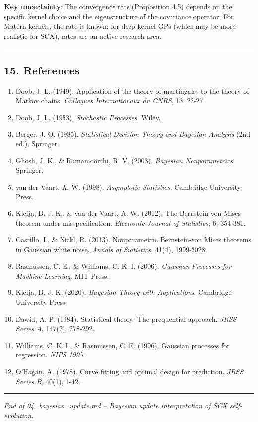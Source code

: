 \documentclass[
  12pt,
]{article}
\providecommand{\tightlist}{%
  \setlength{\itemsep}{0pt}\setlength{\parskip}{0pt}}
\begin{document}
\textbf{Key uncertainty}: The convergence rate (Proposition 4.5) depends
on the specific kernel choice and the eigenstructure of the covariance
operator. For Matérn kernels, the rate is known; for deep kernel GPs
(which may be more realistic for SCX), rates are an active research
area.

\begin{center}\rule{0.5\linewidth}{0.5pt}\end{center}

\subsection{15. References}\label{references}

\begin{enumerate}
\def\labelenumi{\arabic{enumi}.}
\tightlist
\item
  Doob, J. L. (1949). Application of the theory of martingales to the
  theory of Markov chains. \emph{Colloques Internationaux du CNRS}, 13,
  23-27.
\item
  Doob, J. L. (1953). \emph{Stochastic Processes}. Wiley.
\item
  Berger, J. O. (1985). \emph{Statistical Decision Theory and Bayesian
  Analysis} (2nd ed.). Springer.
\item
  Ghosh, J. K., \& Ramamoorthi, R. V. (2003). \emph{Bayesian
  Nonparametrics}. Springer.
\item
  van der Vaart, A. W. (1998). \emph{Asymptotic Statistics}. Cambridge
  University Press.
\item
  Kleijn, B. J. K., \& van der Vaart, A. W. (2012). The Bernstein-von
  Mises theorem under misspecification. \emph{Electronic Journal of
  Statistics}, 6, 354-381.
\item
  Castillo, I., \& Nickl, R. (2013). Nonparametric Bernstein-von Mises
  theorems in Gaussian white noise. \emph{Annals of Statistics}, 41(4),
  1999-2028.
\item
  Rasmussen, C. E., \& Williams, C. K. I. (2006). \emph{Gaussian
  Processes for Machine Learning}. MIT Press.
\item
  Kleijn, B. J. K. (2020). \emph{Bayesian Theory with Applications}.
  Cambridge University Press.
\item
  Dawid, A. P. (1984). Statistical theory: The prequential approach.
  \emph{JRSS Series A}, 147(2), 278-292.
\item
  Williams, C. K. I., \& Rasmussen, C. E. (1996). Gaussian processes for
  regression. \emph{NIPS 1995}.
\item
  O'Hagan, A. (1978). Curve fitting and optimal design for prediction.
  \emph{JRSS Series B}, 40(1), 1-42.
\end{enumerate}

\begin{center}\rule{0.5\linewidth}{0.5pt}\end{center}

\emph{End of 04\_bayesian\_update.md -- Bayesian update interpretation
of SCX self-evolution.}
\end{document}

